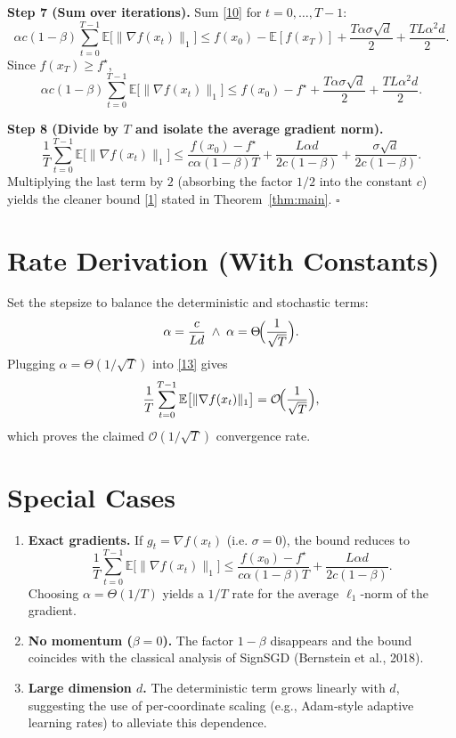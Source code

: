 \documentclass{article}
\begin{document}
\noindent\textbf{Step 7 (Sum over iterations).}  
Sum \eqref{10} for $t=0,\dots,T-1$:
\[
\alpha c(1-\beta)\sum_{t=0}^{T-1}\mathbb{E}\bigl[\|\nabla f(x_{t})\|_{1}\bigr]
\le f(x_{0})- \mathbb{E}[f(x_{T})]
+ \frac{T\alpha\sigma\sqrt{d}}{2}
+ \frac{TL\alpha^{2}d}{2}.
\tag{11}
\]
Since $f(x_{T})\ge f^{\star}$,
\[
\alpha c(1-\beta)\sum_{t=0}^{T-1}\mathbb{E}\bigl[\|\nabla f(x_{t})\|_{1}\bigr]
\le f(x_{0})-f^{\star}
+ \frac{T\alpha\sigma\sqrt{d}}{2}
+ \frac{TL\alpha^{2}d}{2}.
\tag{12}
\]

\noindent\textbf{Step 8 (Divide by $T$ and isolate the average gradient norm).}
\[
\frac{1}{T}\sum_{t=0}^{T-1}\mathbb{E}\bigl[\|\nabla f(x_{t})\|_{1}\bigr]
\le
\frac{f(x_{0})-f^{\star}}{c\alpha(1-\beta)T}
+\frac{L\alpha d}{2c(1-\beta)}
+\frac{\sigma\sqrt{d}}{2c(1-\beta)} .
\tag{13}
\]
Multiplying the last term by $2$ (absorbing the factor $1/2$ into the constant $c$) yields the cleaner bound \eqref{1} stated in Theorem~\ref{thm:main}. \hfill $\square$

\section*{Rate Derivation (With Constants)}
Set the stepsize to balance the deterministic and stochastic terms:
\[
\alpha = \frac{c}{L d}\;\wedge\;\alpha = \Theta\!\Bigl(\frac{1}{\sqrt{T}}\Bigr).
\]
Plugging $\alpha = \Theta(1/\sqrt{T})$ into \eqref{13} gives
\[
\frac{1}{T}\sum_{t=0}^{T-1}\mathbb{E}\bigl[\|\nabla f(x_{t})\|_{1}\bigr]
=
\mathcal{O}\!\Bigl(\frac{1}{\sqrt{T}}\Bigr),
\]
which proves the claimed $\mathcal{O}(1/\sqrt{T})$ convergence rate.

\section*{Special Cases}
\begin{enumerate}
\item \textbf{Exact gradients.} If $g_{t}=\nabla f(x_{t})$ (i.e. $\sigma=0$), the bound reduces to
\[
\frac{1}{T}\sum_{t=0}^{T-1}\mathbb{E}\bigl[\|\nabla f(x_{t})\|_{1}\bigr]
\le
\frac{f(x_{0})-f^{\star}}{c\alpha(1-\beta)T}
+\frac{L\alpha d}{2c(1-\beta)} .
\]
Choosing $\alpha = \Theta(1/T)$ yields a $1/T$ rate for the average $\ell_{1}$‑norm of the gradient.

\item \textbf{No momentum ($\beta=0$).} The factor $1-\beta$ disappears and the bound coincides with the classical analysis of SignSGD (Bernstein et al., 2018).

\item \textbf{Large dimension $d$.} The deterministic term grows linearly with $d$, suggesting the use of per‑coordinate scaling (e.g., Adam‑style adaptive learning rates) to alleviate this dependence.
\end{enumerate}
\end{document}

